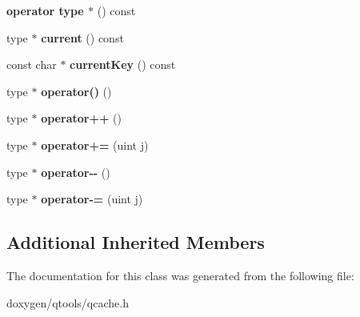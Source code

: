 \begin{DoxyCompactItemize}
\mbox{\label{class_q_cache_iterator_a68acef83d4e3298a81ad61114d4f15ad}} 
{\bfseries operator type $\ast$} () const
\item 
\mbox{\label{class_q_cache_iterator_a09cba0997ab07dc882e165de7d6cf660}} 
type $\ast$ {\bfseries current} () const
\item 
\mbox{\label{class_q_cache_iterator_adf785835f92c73863c95207f2dfcc9ba}} 
const char $\ast$ {\bfseries current\+Key} () const
\item 
\mbox{\label{class_q_cache_iterator_adb5330647feb175a811a3ec945fbaf52}} 
type $\ast$ {\bfseries operator()} ()
\item 
\mbox{\label{class_q_cache_iterator_a5c36908d213c6c78a177d2604b4ed5bd}} 
type $\ast$ {\bfseries operator++} ()
\item 
\mbox{\label{class_q_cache_iterator_a5952cb2e24146f028720fecb7f1420ef}} 
type $\ast$ {\bfseries operator+=} (uint j)
\item 
\mbox{\label{class_q_cache_iterator_a4744ffd97ee1250381519f8ff320a8d1}} 
type $\ast$ {\bfseries operator-\/-\/} ()
\item 
\mbox{\label{class_q_cache_iterator_a735073d70bb5a1540aef84bfab6a8b77}} 
type $\ast$ {\bfseries operator-\/=} (uint j)
\end{DoxyCompactItemize}
\subsection*{Additional Inherited Members}


The documentation for this class was generated from the following file\+:\begin{DoxyCompactItemize}
\item 
doxygen/qtools/qcache.\+h\end{DoxyCompactItemize}
